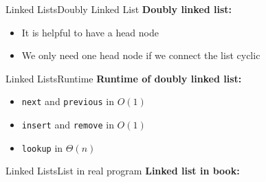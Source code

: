 
\begin{frame}{Linked Lists}{Doubly Linked List}
  \textbf{Doubly linked list:}
  \begin{itemize}
    \item<2->
      It is helpful to have a {\color{Mittel-Blau}head} node
    \item<3->
      We only need {\color{Mittel-Blau}one head} node if we connect the list
      cyclic
  \end{itemize}
  \begin{flushleft}
    
  \end{flushleft}
\end{frame}


\begin{frame}{Linked Lists}{Runtime}
  \textbf{Runtime of doubly linked list:}
  \begin{itemize}
    \item<2->
      {\color{Mittel-Blau}\texttt{next}} and
      {\color{Mittel-Blau}\texttt{previous}} in $O(1)$\\[0.5em]
      \vspace{1em}
    \item<4->
      {\color{Mittel-Blau}\texttt{insert}} and
      {\color{Mittel-Blau}\texttt{remove}} in $O(1)$\\[0.5em]
      \vspace{1em}
    \item<6->
      {\color{Mittel-Blau}\texttt{lookup}} in $\Theta(n)$\\[0.5em]
  \end{itemize}
\end{frame}


\begin{frame}{Linked Lists}{List in real program}
  \textbf{Linked list in book:}
  \vspace{-1.5em}
  \begin{flushleft}
    
  \end{flushleft}
\end{frame}

